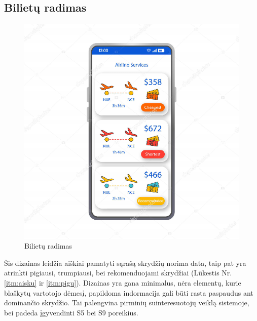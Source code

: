\documentclass{VUMIFPSkursinis}
\begin{document}
\subsection{Bilietų radimas}
\begin{figure}[H]
    \centering
    \includegraphics[scale=0.8]{img/deposit.png}
    \caption{Bilietų radimas}
    \label{img:radimas1}
\end{figure}
Šis dizainas leidžia aiškiai pamatyti sąrašą skrydžių norima data, taip pat yra atrinkti pigiausi, trumpiausi, bei rekomenduojami skrydžiai  (Lūkestis Nr. \ref{itm:aisku} ir  \ref{itm:pigu}). Dizainas yra gana minimalus, nėra elementų, kurie blaškytų vartotojo dėmesį, papildoma indormacija gali būti rasta paspaudus ant dominančio skrydžio. Tai palengvina pirminių suinteresuotojų veiklą sistemoje, bei padeda įgyvendinti S5 bei S9 poreikius.

\newpage
\end{document}
